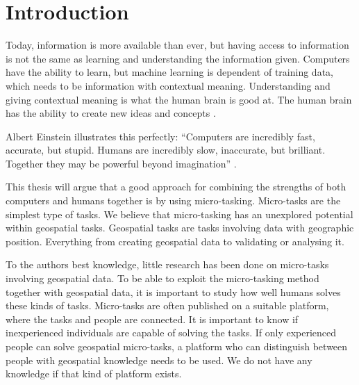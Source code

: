 \chapter{Introduction}
 Today, information is more available than ever, but having access to information is not the same as learning and understanding the information given. Computers have the ability to learn, but machine learning is dependent of training data, which needs to be information with contextual meaning. Understanding and giving contextual meaning is what the human brain is good at. The human brain has the ability to create new ideas and concepts \citep{Ross2016}. 

Albert Einstein illustrates this perfectly: “Computers are incredibly fast, accurate, but stupid. Humans are incredibly slow, inaccurate, but brilliant. Together they may be powerful beyond imagination” \citep{Holzinger2013}. 

This thesis will argue that a good approach for combining the strengths of both computers and humans together is by using micro-tasking. Micro-tasks are the simplest type of tasks. We believe that micro-tasking has an unexplored potential within geospatial tasks. Geospatial tasks are tasks involving data with geographic position. Everything from creating geospatial data to validating or analysing it. 

To the authors best knowledge, little research has been done on micro-tasks involving geospatial data. To be able to exploit the micro-tasking method together with geospatial data, it is important to study how well humans solves these kinds of tasks. Micro-tasks are often published on a suitable platform, where the tasks and people are connected. It is important to know if inexperienced individuals are capable of solving the tasks. If only experienced people can solve geospatial micro-tasks, a platform who can distinguish between people with geospatial knowledge needs to be used. We do not have any knowledge if that kind of platform exists. 

